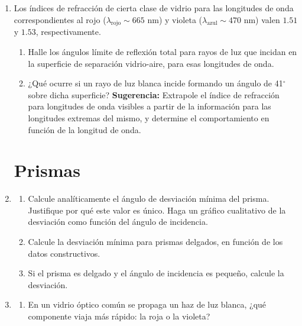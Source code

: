 \documentclass[11pt,spanish]{article}
\begin{document}
\begin{enumerate}

    \item Los índices de refracción de cierta clase de vidrio para las
    longitudes de onda correspondientes al rojo ($\lambda_\text{rojo} \sim 665$
    nm) y violeta ($\lambda_\text{azul} \sim 470$ nm) valen $1.51$ y $1.53$,
    respectivamente.
    
    \begin{enumerate}
        \item Halle los ángulos límite de reflexión total para rayos de luz que
        incidan en la superficie de separación vidrio-aire, para esas longitudes
        de onda.
    
        \item ¿Qué ocurre si un rayo de luz blanca incide formando un ángulo de
        41$^{\circ}$ sobre dicha superficie? \textbf{Sugerencia:} Extrapole el
        índice de refracción para longitudes de onda visibles a partir de la
        información para las longitudes extremas del mismo, y determine el
        comportamiento en función de la longitud de onda.
    \end{enumerate}

\section*{Prismas}    
    
    
    \item 
    \begin{enumerate}
        \item Calcule analíticamente el ángulo de desviación mínima del prisma.
        Justifique por qué este valor es único. Haga un gráfico cualitativo
        de la desviación como función del ángulo de incidencia.

        \item Calcule la desviación mínima para prismas delgados, en función de
        los datos constructivos.

        \item Si el prisma es delgado y el ángulo de incidencia es pequeño,
        calcule la desviación.
    \end{enumerate}


    \item 
    \begin{enumerate}
        \item En un vidrio óptico común se propaga un haz de luz blanca, ¿qué
        componente viaja más rápido: la roja o la violeta?


\end{enumerate}
\end{enumerate}
\end{document}
